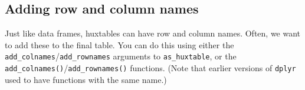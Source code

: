 \documentclass[]{article}
\newenvironment{Shaded}{\begin{snugshade}}{\end{snugshade}}
\newcommand{\DataTypeTok}[1]{\textcolor[rgb]{0.13,0.29,0.53}{#1}}
\newcommand{\DecValTok}[1]{\textcolor[rgb]{0.00,0.00,0.81}{#1}}
\newcommand{\KeywordTok}[1]{\textcolor[rgb]{0.13,0.29,0.53}{\textbf{#1}}}
\newcommand{\NormalTok}[1]{#1}
\newcommand{\OperatorTok}[1]{\textcolor[rgb]{0.81,0.36,0.00}{\textbf{#1}}}
\newcommand{\StringTok}[1]{\textcolor[rgb]{0.31,0.60,0.02}{#1}}
\begin{document}
\FloatBarrier

\hypertarget{adding-row-and-column-names}{%
\subsection{Adding row and column
names}\label{adding-row-and-column-names}}

Just like data frames, huxtables can have row and column names. Often,
we want to add these to the final table. You can do this using either
the \texttt{add\_colnames}/\texttt{add\_rownames} arguments to
\texttt{as\_huxtable}, or the
\texttt{add\_colnames()}/\texttt{add\_rownames()} functions. (Note that
earlier versions of \texttt{dplyr} used to have functions with the same
name.)

\begin{Shaded}
\end{Shaded}
\end{document}
